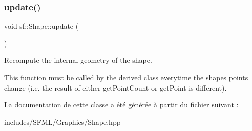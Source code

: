 \subsubsection{\texorpdfstring{update()}{update()}}
{\footnotesize\ttfamily void sf\+::\+Shape\+::update (\begin{DoxyParamCaption}{ }\end{DoxyParamCaption})\hspace{0.3cm}{\ttfamily [protected]}}



Recompute the internal geometry of the shape. 

This function must be called by the derived class everytime the shape\textquotesingle{}s points change (i.\+e. the result of either get\+Point\+Count or get\+Point is different). 

La documentation de cette classe a été générée à partir du fichier suivant \+:\begin{DoxyCompactItemize}
\item 
includes/\+S\+F\+M\+L/\+Graphics/Shape.\+hpp\end{DoxyCompactItemize}
